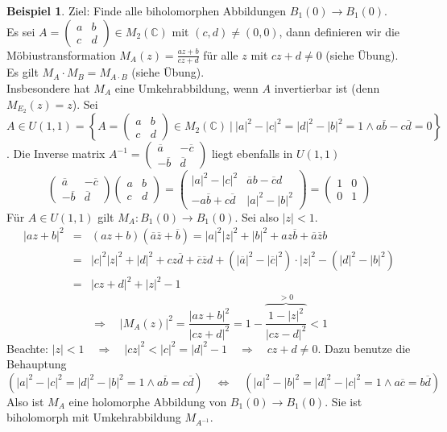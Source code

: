 \documentclass[11pt,titlepage]{article}
\theoremstyle{definition}
\newtheorem{example}[theorem]{Beispiel}
\theoremstyle{remark}
\begin{document}
	\begin{example}
		Ziel: Finde alle biholomorphen Abbildungen $B_1(0)\to B_1(0)$. \\Es sei $A=\left(
		\begin{smallmatrix} a&b \\ c&d \end{smallmatrix}\right)\in M_2 (\mathbb{C})$ mit 
		$(c,d)\neq (0,0)$, dann definieren wir die Möbiustransformation 
		$M_A (z)=\frac{az+b}{cz+d}$ für alle $z$ mit $cz+d \neq 0$ (siehe Übung). \\
		Es gilt $M_A \cdot M_B =M_{A\cdot B}$ (siehe Übung). \\
		Insbesondere hat $M_A$ eine Umkehrabbildung, wenn $A$ invertierbar ist (denn 
		$M_{E_2}(z)=z$). Sei $A\in U(1,1)=\left\{ A=\left(\begin{smallmatrix} a&b\\c&d \end{smallmatrix}
		\right)\in M_2 (\mathbb{C})\  \vert\  |a|^2 -|c|^2 =|d|^2 -|b|^2 =1 \land a\overline{b}-c\overline{d}=0 
		\right\}$. Die Inverse matrix $A^{-1} =\left( \begin{smallmatrix} \overline{a}&-\overline{c} \\
		-\overline{b}&\overline{d} \end{smallmatrix}\right)$ liegt ebenfalls in $U(1,1)$
		\[ \begin{pmatrix} \overline{a}&-\overline{c} \\
		 -\overline{b}&\overline{d} \end{pmatrix}
		\begin{pmatrix} a&b \\
		c&d \end{pmatrix}
		=\begin{pmatrix}|a|^2 -|c|^2 & \overline{a}b-\overline{c}d \\
		-a\overline{b}+c\overline{d} & |a|^2 -|b|^2 \end{pmatrix}
		=\begin{pmatrix} 1&0\\0&1 \end{pmatrix} \]
		Für $A\in U(1,1)$ gilt $M_A :B_1(0)\to B_1(0)$. Sei also $|z|<1$. 
		\begin{eqnarray*}
			|az+b|^2 &=& (az+b)(\overline{a}\overline{z}+\overline{b})=|a|^2 |z|^2 +|b|^2 +az\overline{b}
			+\overline{a}\overline{z}b \\
			&=& |c|^2|z|^2 +|d|^2 +cz\overline{d} +\overline{c}\overline{z}d+(|\overline{a}|^2 -
			|\overline{c}|^2)\cdot |z|^2 -(|d|^2 -|b|^2) \\
			&=& |cz+d|^2 +|z|^2 -1
		\end{eqnarray*}
		\[\Rightarrow \quad |M_A(z)|^2 = \frac{|az+b|^2}{|cz+d|^2}=1-\overbrace{\frac{1-|z|^2}{|cz-d|^2}}^{
		>0}<1 \]
		Beachte: $|z|<1\quad\Rightarrow\quad |cz|^2 <|c|^2 =|d|^2 -1
		\quad\Rightarrow\quad cz+d\neq 0$. Dazu benutze die Behauptung
		\[ \left(|a|^2 -|c|^2 =|d|^2 -|b|^2 =1 \land a\overline{b} =c\overline{d}\right) 
		\quad\Leftrightarrow\quad 
		\left(|a|^2 -|b|^2 =|d|^2 -|c|^2 =1 \land a\overline{c}=b\overline{d}\right) \]
		Also ist $M_A$ eine holomorphe Abbildung von $B_1(0)\to B_1(0)$. Sie ist biholomorph mit 
		Umkehrabbildung $M_{A^{-1}}$.
	\end{example}
	
\end{document}
